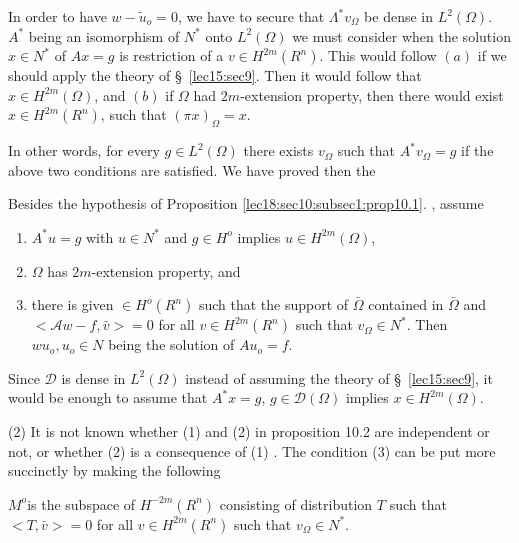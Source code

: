In order to have $w-\tilde{u}_o = 0$, we have to secure that $\Lambda
^* v_{\Omega}$ be dense in $L^2 (\Omega )$. $A^*$ being an isomorphism
of $N^*$ onto $L^2 (\Omega)$ we must consider when the solution $x
\in N^*$ of $Ax = g$ is restriction of a $v \in H^{2m}
(R^n)$. This would follow $(a)$ if we should apply the theory of \S\
\ref{lec15:sec9}. Then it would follow that $x \in H^{2m} (\Omega )$, and
$(b)$ if $\Omega$ had $2m$-extension property, then there would exist
$x \in H^{2m} (R^n)$, such that $(\pi x)_{\Omega} = x$.  

In other words, for every $g \in L^2 (\Omega )$ there exists
$v_\Omega$ such that $A^* v_\Omega = g$ if the above two conditions are
satisfied. We have proved then the  
\begin{proposition}\label{lec18:sec10:subsec1:prop10.2}%
  Besides the hypothesis of Proposition \ref{lec18:sec10:subsec1:prop10.1}. , assume 
  \begin{enumerate}[\rm 1)]
  \item $A^* u = g$ with $u \in N^*$ and $g \in H^o$
    implies $u \in H^{2m} (\Omega)$,  
  \item $\Omega$ has $2m$-extension property, and
  \item there is given $\in H^o (R^n)$ such that the support of
    $\bar{\Omega}$ 
    contained in $\bar{\Omega}$ and $ < \mathscr{A}w - f, \bar{v} > = 0$
    for all $v \in H^{2m} (R^n)$ such that $v_{\Omega} \in
    N^*$. Then $w u_o, u_o \in N$ being the solution of $Au_o = f$.  
  \end{enumerate}
\end{proposition}

\begin{remarks*}
  Since $\mathscr{D}$ is dense in $L^2 (\Omega )$ instead of assuming
  the theory of \S\ \ref{lec15:sec9}, it would be enough to assume that $A^* x = g$,
  $g \in \mathscr{D} (\Omega )$ implies $x \in H^{2m}
  (\Omega)$.  
\end{remarks*}

(2) It is not known whether (1) and (2) in proposition 10.2
  are independent or not, or whether (2) is a consequence of (1)
  . The condition (3) can be put more succinctly by making the
  following 
  \begin{definition}\label{lec18:sec10:subsec1:def10.1}%
    $M^o$\pageoriginale is the subspace of $H^{-2m} (R^n)$ consisting of distribution
  $T$ such that $< T, \bar{v} > = 0$ for all $v \in H^{2m}
  (R^n)$ such that $v_{\Omega} \in N^*$.  
\end{definition}

